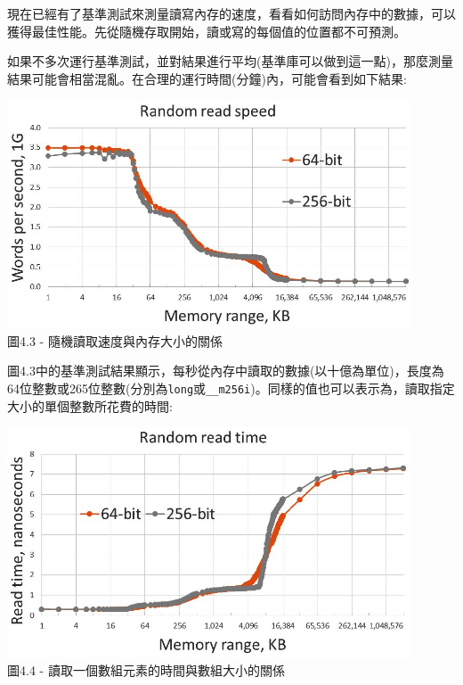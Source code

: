 
現在已經有了基準測試來測量讀寫內存的速度，看看如何訪問內存中的數據，可以獲得最佳性能。先從隨機存取開始，讀或寫的每個值的位置都不可預測。


如果不多次運行基準測試，並對結果進行平均(基準庫可以做到這一點)，那麼測量結果可能會相當混亂。在合理的運行時間(分鐘)內，可能會看到如下結果:

\begin{center}
\includegraphics[width=0.9\textwidth]{content/1/chapter4/images/3.jpg}\\
圖4.3 - 隨機讀取速度與內存大小的關係
\end{center}

圖4.3中的基準測試結果顯示，每秒從內存中讀取的數據(以十億為單位)，長度為64位整數或265位整數(分別為\texttt{long}或\texttt{\_\_m256i})。同樣的值也可以表示為，讀取指定大小的單個整數所花費的時間:

\begin{center}
\includegraphics[width=0.9\textwidth]{content/1/chapter4/images/4.jpg}\\
圖4.4 - 讀取一個數組元素的時間與數組大小的關係
\end{center}

